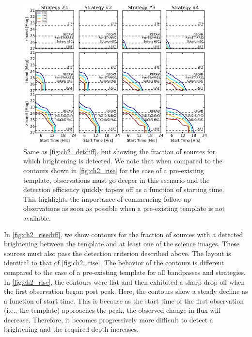 \begin{figure}[t!]
\centering
\includegraphics[width=0.9\textwidth]{./figs/chapter2/ch2_f13.pdf}
\caption{Same as \autoref{fig:ch2_detdiff}, but showing the fraction of sources for which brightening is detected. We note that when compared to the contours shown in \autoref{fig:ch2_rise} for the case of a pre-existing template, observations must go deeper in this scenario and the detection efficiency quickly tapers off as a function of starting time. This highlights the importance of commencing follow-up observations as soon as possible when a pre-existing template is not available.}
\label{fig:ch2_risediff}
\end{figure}

In \autoref{fig:ch2_risediff}, we show contours for the fraction of sources with a detected brightening between the template and at least one of the science images. These sources must also pass the detection criterion described above. The layout is identical to that of \autoref{fig:ch2_rise}. The behavior of the contours is different compared to the case of a pre-existing template for all bandpasses and strategies. In \autoref{fig:ch2_rise}, the contours were flat and then exhibited a sharp drop off when the first observation began post peak. Here, the contours show a steady decline as a function of start time. This is because as the start time of the first observation (i.e., the template) approaches the peak, the observed change in flux will decrease. Therefore, it becomes progressively more difficult to detect a brightening and the required depth increases.

